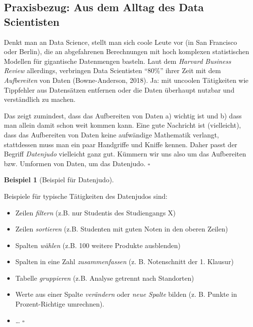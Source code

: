\documentclass[
  letterpaper,
  oneside,
  open=any]{scrbook}
\providecommand{\tightlist}{%
  \setlength{\itemsep}{0pt}\setlength{\parskip}{0pt}}\usepackage{longtable,booktabs,array}
\theoremstyle{definition}
\theoremstyle{definition}
\newtheorem{example}{Beispiel}[chapter]
\theoremstyle{definition}
\theoremstyle{remark}
\begin{document}
\subsection{Praxisbezug: Aus dem Alltag des Data
Scientisten}\label{praxisbezug-aus-dem-alltag-des-data-scientisten}

Denkt man an Data Science, stellt man sich coole Leute vor (in San
Francisco oder Berlin), die an abgefahrenen Berechnungen mit hoch
komplexen statistischen Modellen für gigantische Datenmengen basteln.
Laut dem \emph{Harvard Business Review} allerdings, verbringen Data
Scientisten \enquote{80\%} ihrer Zeit mit dem \emph{Aufbereiten} von
Daten (Bowne-Anderson, 2018). Ja: mit uncoolen Tätigkeiten wie
Tippfehler aus Datensätzen entfernen oder die Daten überhaupt nutzbar
und verständlich zu machen.

Das zeigt zumindest, dass das Aufbereiten von Daten a) wichtig ist und
b) dass man allein damit schon weit kommen kann. Eine gute Nachricht ist
(vielleicht), dass das Aufbereiten von Daten keine aufwändige Mathematik
verlangt, stattdessen muss man ein paar Handgriffe und Kniffe kennen.
Daher passt der Begriff \emph{Datenjudo} vielleicht ganz gut. Kümmern
wir uns also um das Aufbereiten bzw. Umformen von Daten, um das
Datenjudo. \(\square\)

\begin{example}[Beispiel für
Datenjudo]\protect\hypertarget{exm-datenjudo}{}\label{exm-datenjudo}

Beispiele für typische Tätigkeiten des Datenjudos sind:

\begin{itemize}
\tightlist
\item
  Zeilen \emph{filtern} (z.B. nur Studentis des Studiengangs X)
\item
  Zeilen \emph{sortieren} (z.B. Studenten mit guten Noten in den oberen
  Zeilen)
\item
  Spalten \emph{wählen} (z.B. 100 weitere Produkte ausblenden)
\item
  Spalten in eine Zahl \emph{zusammenfassen} (z. B. Notenschnitt der 1.
  Klausur)
\item
  Tabelle \emph{gruppieren} (z.B. Analyse getrennt nach Standorten)
\item
  Werte aus einer Spalte \emph{verändern} oder \emph{neue Spalte} bilden
  (z. B. Punkte in Prozent-Richtige umrechnen).
\item
  \ldots{} \(\square\)
\end{itemize}

\end{example}
\end{document}
